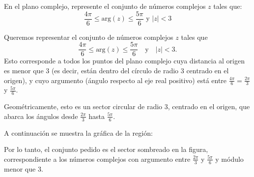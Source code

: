\begin{prob} En el plano complejo, represente el conjunto de números complejos $z$ tales que:
$$\dfrac{4\pi}{6}\leq\text{arg}(z)\leq\dfrac{5\pi}{6} \text{ y } |z|<3$$
\begin{myproof}
Queremos representar el conjunto de números complejos $z$ tales que
\[
\dfrac{4\pi}{6}\leq\text{arg}(z)\leq\dfrac{5\pi}{6} \quad \text{y} \quad |z|<3.
\]
Esto corresponde a todos los puntos del plano complejo cuya distancia al origen es menor que $3$ (es decir, están dentro del círculo de radio $3$ centrado en el origen), y cuyo argumento (ángulo respecto al eje real positivo) está entre $\frac{4\pi}{6} = \frac{2\pi}{3}$ y $\frac{5\pi}{6}$.

Geométricamente, esto es un sector circular de radio $3$, centrado en el origen, que abarca los ángulos desde $\frac{2\pi}{3}$ hasta $\frac{5\pi}{6}$.

A continuación se muestra la gráfica de la región:

\begin{center}
\end{center}

Por lo tanto, el conjunto pedido es el sector sombreado en la figura, correspondiente a los números complejos con argumento entre $\frac{2\pi}{3}$ y $\frac{5\pi}{6}$ y módulo menor que $3$.
\end{myproof}

\end{prob}

